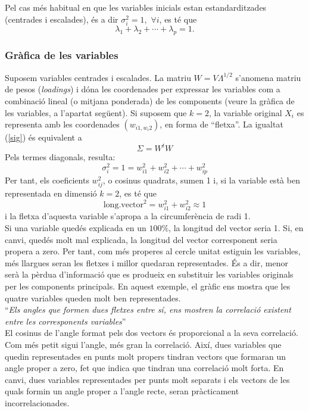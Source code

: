 \documentclass[english]{article}
\begin{document}
Pel cas més habitual en que les variables inicials estan
estandarditzades (centrades i escalades), és a dir $\sigma_i^2=1$,
$\,\forall i$, es té que
$$
\lambda_1+\lambda_2+\cdots + \lambda_p=1.
$$



\subsubsection{Gràfica de les variables}

 Suposem variables centrades i escalades. La matriu $W=V\Lambda^{1/2}$
s'anomena matriu de pesos (\emph{loadings})  i dóna les coordenades
per expressar  les variables com a combinació lineal (o mitjana
ponderada) de les components (veure la gràfica de les variables, a
l'apartat següent). Si suposem que $k=2$, la variable original $X_i$
 es representa amb les coordenades $(w_{i1,w_i2})$, en forma de ``fletxa''. La igualtat
 (\ref{sig}) és equivalent a
 $$
 \Sigma=W^tW
 $$
 Pels termes diagonals, resulta:
 $$
 \sigma_i^2=1=w_{i1}^2+w_{i2}^2+\cdots+w_{ip}^2
 $$
Per tant, els coeficients $w_{ij}^2$, o cosinus quadrats, sumen 1 i,
si la variable està ben representada en dimensió $k=2$, es té que
$$
\mbox{long.vector}^2=w_{i1}^2+w_{i2}^2\approx 1
$$
i la fletxa d'aquesta variable s'apropa a la circumferència de radi
1.
\\

Si una variable quedés explicada en un $100\%$, la longitud del vector seria 1. Si, en canvi, quedés molt mal explicada, la longitud del vector corresponent seria propera a zero. Per tant, com més properes al cercle unitat estiguin les variables, més llargues seran les fletxes i millor quedaran representades. És a dir, menor serà la pèrdua d'informació que es produeix en substituir les variables originals per les components principals.
En aquest exemple, el gràfic ens mostra que les quatre variables queden molt ben
representades.
\\

``\textit{Els angles que formen dues fletxes entre sí, ens mostren la correlació existent entre les corresponents variables}''
\\

El cosinus de l'angle format pels dos vectors és proporcional a la seva correlació. Com
més petit sigui l'angle, més gran la correlació. Així, dues variables que quedin
representades en punts molt propers tindran vectors que formaran un angle proper a zero, fet que indica que tindran una correlació molt forta. En canvi, dues variables representades per punts molt separats i els vectors de les quals formin un angle proper a l'angle recte, seran pràcticament incorrelacionades.
\\
\end{document}
